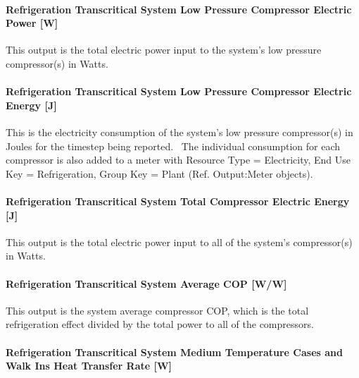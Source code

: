 \paragraph{Refrigeration Transcritical System Low Pressure Compressor Electric Power {[}W{]}}\label{refrigeration-transcritical-system-low-pressure-compressor-electric-power-w}

This output is the total electric power input to the system's low pressure compressor(s) in Watts.

\paragraph{Refrigeration Transcritical System Low Pressure Compressor Electric Energy {[}J{]}}\label{refrigeration-transcritical-system-low-pressure-compressor-electric-energy-j}

This is the electricity consumption of the system's low pressure compressor(s) in Joules for the timestep being reported.~ The individual consumption for each compressor is also added to a meter with Resource Type = Electricity, End Use Key = Refrigeration, Group Key = Plant (Ref. Output:Meter objects).

\paragraph{Refrigeration Transcritical System Total Compressor Electric Energy {[}J{]}}\label{refrigeration-transcritical-system-total-compressor-electric-energy-j}

This output is the total electric power input to all of the system's compressor(s) in Watts.

\paragraph{Refrigeration Transcritical System Average COP {[}W/W{]}}\label{refrigeration-transcritical-system-average-cop-ww}

This output is the system average compressor COP, which is the total refrigeration effect divided by the total power to all of the compressors.

\paragraph{Refrigeration Transcritical System Medium Temperature Cases and Walk Ins Heat Transfer Rate {[}W{]}}\label{refrigeration-transcritical-system-medium-temperature-cases-and-walk-ins-heat-transfer-rate-w}

